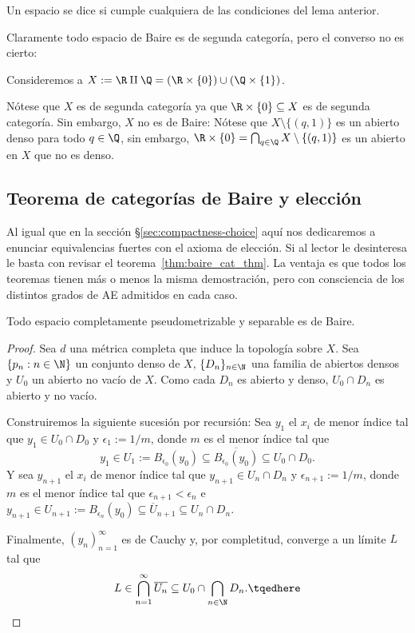 \documentclass[topologia-analisis.tex]{subfiles}
\begin{document}
\begin{mydefi}
	Un espacio se dice  si cumple cualquiera de las condiciones del lema anterior.
\end{mydefi}
Claramente todo espacio de Baire es de segunda categoría, pero el converso no es cierto:

\begin{exn}
	Consideremos a $X := \R \amalg \Q = (\R\times\{0\}) \cup (\Q\times\{1\})$.
	\par
	Nótese que $X$ es de segunda categoría ya que $\R\times\{0\} \subseteq X$ es de segunda categoría.
	Sin embargo, $X$ no es de Baire:
	Nótese que $X \setminus \{(q, 1)\}$ es un abierto denso para todo $q \in \Q$, sin embargo,
	$ \R\times\{0\} = \bigcap_{q \in \Q} X \setminus \{(q, 1)\} $ es un abierto en $X$ que no es denso.
\end{exn}

\subsection{Teorema de categorías de Baire y elección}
Al igual que en la sección \S\ref{sec:compactness-choice} aquí nos dedicaremos a enunciar equivalencias fuertes con el axioma de elección.
Si al lector le desinteresa le basta con revisar el teorema~\ref{thm:baire_cat_thm}.
La ventaja es que todos los teoremas tienen más o menos la misma demostración, pero con consciencia de los distintos grados de AE admitidos en cada caso.

\begin{thm}
	Todo espacio completamente pseudometrizable y separable es de Baire.
\end{thm}
\begin{proof}
	Sea $d$ una métrica completa que induce la topología sobre $X$.
	Sea $\{p_n : n\in\N\}$ un conjunto denso de $X$, $\{D_n\}_{n\in\N}$ una familia de abiertos densos y $U_0$ un abierto no vacío de $X$.
	Como cada $D_n$ es abierto y denso, $U_0\cap D_n$ es abierto y no vacío.

	Construiremos la siguiente sucesión por recursión:
	Sea $y_1$ el $x_i$ de menor índice tal que $y_1 \in U_0\cap D_0$ y $\epsilon_1 := 1/m$, donde $m$ es el menor índice tal que
	$$ y_1 \in U_1 := B_{\epsilon_0}(y_0) \subseteq \overline{ B_{\epsilon_0}(y_0) } \subseteq U_0\cap D_0. $$
	Y sea $y_{n+1}$ el $x_i$ de menor índice tal que $y_{n+1} \in U_n\cap D_n$ y $\epsilon_{n+1} := 1/m$, donde $m$ es el menor índice tal que
	$\epsilon_{n+1} < \epsilon_n$ e $y_{n+1} \in U_{n+1} := B_{\epsilon_n}(y_0) \subseteq \overline{U}_{n+1} \subseteq U_n\cap D_n$.

	Finalmente, $(y_n)_{n=1}^\infty$ es de Cauchy y, por completitud, converge a un límite $L$ tal que
	\begin{equation}
		L\in \bigcap_{n=1}^\infty \overline{U_n} \subseteq U_0 \cap \bigcap_{n\in\N} D_n. \tqedhere
	\end{equation}
\end{proof}
\end{document}
